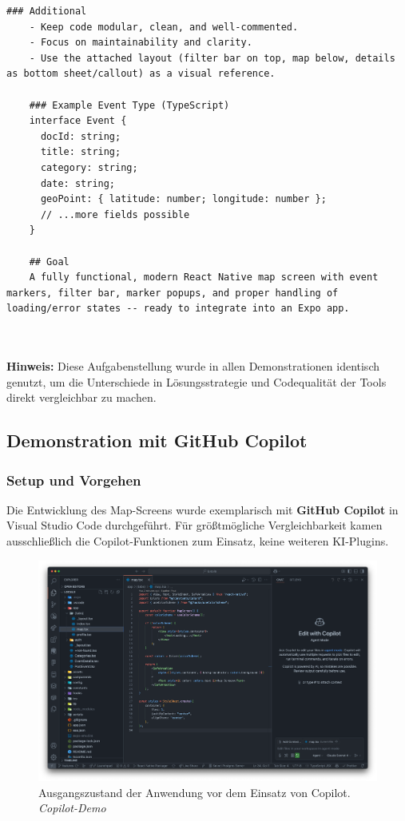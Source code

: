 \begin{lstlisting}[]
    ### Additional
    - Keep code modular, clean, and well-commented.
    - Focus on maintainability and clarity.
    - Use the attached layout (filter bar on top, map below, details as bottom sheet/callout) as a visual reference.
    
    ### Example Event Type (TypeScript)
    interface Event {
      docId: string;
      title: string;
      category: string;
      date: string;
      geoPoint: { latitude: number; longitude: number };
      // ...more fields possible
    }

    ## Goal
    A fully functional, modern React Native map screen with event markers, filter bar, marker popups, and proper handling of loading/error states -- ready to integrate into an Expo app.

    
    \end{lstlisting}

\noindent
\textbf{Hinweis:} Diese Aufgabenstellung wurde in allen Demonstrationen identisch genutzt, um die Unterschiede in Lösungsstrategie und Codequalität der Tools direkt vergleichbar zu machen.

\subsection{Demonstration mit GitHub Copilot}

\subsubsection{Setup und Vorgehen}
Die Entwicklung des Map-Screens wurde exemplarisch mit \textbf{GitHub Copilot}
in Visual Studio Code durchgeführt. Für größtmögliche Vergleichbarkeit kamen
ausschließlich die Copilot-Funktionen zum Einsatz, keine weiteren KI-Plugins.

\begin{figure}[htbp]
      \centering
      \vspace{1em}
      \includegraphics[width=1\textwidth]{images/copilot_screenshots/Screenshots Ist-Zustand-copilot.png}
      \caption{Ausgangszustand der Anwendung vor dem Einsatz von Copilot. \textit{Copilot-Demo}}
      \label{fig:copilot-istzustand}
\end{figure}

